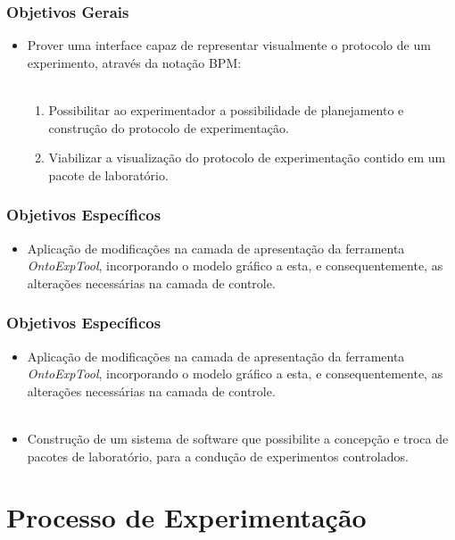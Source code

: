 \documentclass[aspectratio=169]{beamer}
\begin{document}
\begin{frame}
\frametitle{Objetivos Gerais}
\justifying

\begin{itemize}
\item Prover uma interface capaz de representar visualmente o protocolo de um experimento, através da notação BPM:
\\~\\
\begin{enumerate}
\item Possibilitar ao experimentador a possibilidade de planejamento e construção do protocolo de experimentação.
\item Viabilizar a visualização do protocolo de experimentação contido em um pacote de laboratório.
\end{enumerate}
\end{itemize}
\end{frame}

\begin{frame}
\frametitle{Objetivos Específicos}
\justifying
\begin{itemize}
\item Aplicação de modificações na camada de apresentação da ferramenta \textit{OntoExpTool}, incorporando o modelo gráfico a esta, e consequentemente, as alterações necessárias na camada de controle.
\end{itemize}

\end{frame}

\begin{frame}
\frametitle{Objetivos Específicos}
\justifying

\begin{itemize}
\item Aplicação de modificações na camada de apresentação da ferramenta \textit{OntoExpTool}, incorporando o modelo gráfico a esta, e consequentemente, as alterações necessárias na camada de controle.
\\~\\
\item Construção de um sistema de software que possibilite a concepção e troca de pacotes de laboratório, para a condução de experimentos controlados.

\end{itemize}
\end{frame}

\section{Processo de Experimentação}
\end{document}
